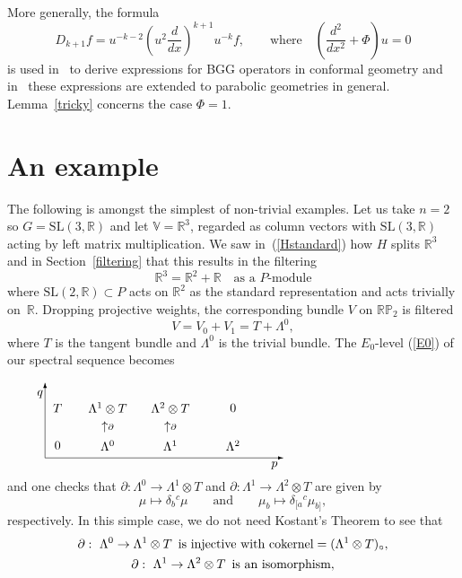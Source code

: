 \documentclass[pdftex]{sigma}
\begin{document}
\begin{remark} More generally, the formula
\[D_{k+1}f=u^{-k-2}\left(u^2\frac{d}{dx}\right)^{k+1}u^{-k}f,
\qquad\mbox{where} \quad \left(\frac{d^2}{dx^2}+\Phi\right)u=0\]
is used in~\cite{g} to derive expressions for BGG operators in conformal
geometry and in~\cite{cds} these expressions are extended to parabolic
geometries in general. Lemma~\ref{tricky} concerns the case $\Phi=1$.
\end{remark}

\section{An example}

The following is amongst the simplest of non-trivial examples. Let us take
$n=2$ so $G={\mathrm{SL}}(3,{\mathbb{R}})$ and let
${\mathbb{V}}={\mathbb{R}}^3$, regarded as column vectors with
${\mathrm{SL}}(3,{\mathbb{R}})$ acting by left matrix multiplication. We saw in~(\ref{Hstandard}) how $H$ splits ${\mathbb{R}}^3$ and in Section~\ref{filtering} that
this results in the f\/iltering
\[{\mathbb{R}}^3={\mathbb{R}}^2+{\mathbb{R}}\quad\mbox{as a $P$-module}\]
where ${\mathrm{SL}}(2,{\mathbb{R}})\subset P$ acts on ${\mathbb{R}}^2$ as the
standard representation and acts trivially on~${\mathbb{R}}$. Dropping
projective weights, the corresponding bundle $V$ on ${\mathbb{RP}}_2$ is
f\/iltered
\[V=V_0+V_1=T+\Lambda^0,\]
where $T$ is the tangent bundle and $\Lambda^0$ is the trivial bundle. The
$E_0$-level (\ref{E0}) of our spectral sequence becomes
\[\begin{picture}(300,70)(0,15)
\put(0,20){\vector(1,0){190}}
\put(0,20){\vector(0,1){60}}
\put(183,14){\makebox(0,0){$p$}}
\put(-4,71){\makebox(0,0){$q$}}
\put(10,60){\makebox(0,0){$T$}}
\put(50,60){\makebox(0,0){$\Lambda^1\otimes T$}}
\put(100,60){\makebox(0,0){$\Lambda^2\otimes T$}}
\put(150,60){\makebox(0,0){$0$}}
\put(50,45){\makebox(0,0){$\uparrow\scriptstyle\partial$}}
\put(100,45){\makebox(0,0){$\uparrow\scriptstyle\partial$}}
\put(10,30){\makebox(0,0){$0$}}
\put(50,30){\makebox(0,0){$\Lambda^0$}}
\put(100,30){\makebox(0,0){$\Lambda^1$}}
\put(150,30){\makebox(0,0){$\Lambda^2$}}
\end{picture}\]
and one checks that $\partial:\Lambda^0\to\Lambda^1\otimes T$ and
$\partial:\Lambda^1\to\Lambda^2\otimes T$ are given by
\[\mu\mapsto\delta_b{}^c\mu\qquad\mbox{and}\qquad
\mu_b\mapsto\delta_{[a}{}^c\mu_{b]},\]
respectively. In this simple case, we do not need Kostant's Theorem to see that
 \begin{gather*}
\partial: \ \Lambda^0\to\Lambda^1\otimes T\enskip\mbox{is injective with
cokernel}=(\Lambda^1\otimes T)_\circ,\\
\partial: \ \Lambda^1\to\Lambda^2\otimes T\enskip\mbox{is an isomorphism},
\end{gather*}
\end{document}
